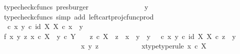 \begin{isabellebody}
\ {\isacharparenleft}{\kern0pt}typecheck{\isacharunderscore}{\kern0pt}cfuncs{\isacharcomma}{\kern0pt}\ presburger{\isacharparenright}{\kern0pt}\isanewline
\ \ \ \ \ \ \ \ \ \ \isamarkupfalse%
\ \isamarkupfalse%
\ {\isachardoublequoteopen}{\isachardot}{\kern0pt}{\isachardot}{\kern0pt}{\isachardot}{\kern0pt}\ {\isacharequal}{\kern0pt}\ y{\isachardoublequoteclose}\isanewline
\ \ \ \ \ \ \ \ \ \ \ \ \isamarkupfalse%
\ {\isacharparenleft}{\kern0pt}typecheck{\isacharunderscore}{\kern0pt}cfuncs{\isacharcomma}{\kern0pt}\ simp\ add{\isacharcolon}{\kern0pt}\ left{\isacharunderscore}{\kern0pt}cart{\isacharunderscore}{\kern0pt}proj{\isacharunderscore}{\kern0pt}cfunc{\isacharunderscore}{\kern0pt}prod{\isacharparenright}{\kern0pt}\isanewline
\ \ \ \ \ \ \ \ \ \ \isamarkupfalse%
\ \isamarkupfalse%
\ {\isachardoublequoteopen}{\isacharparenleft}{\kern0pt}{\isasymTheta}\ {\isasymcirc}\isactrlsub c\ {\isasymlangle}x{\isacharcomma}{\kern0pt}\ y{\isasymrangle}{\isacharparenright}{\kern0pt}\isactrlsup {\isasymflat}\ {\isasymcirc}\isactrlsub c\ {\isasymlangle}id\ X{\isacharcomma}{\kern0pt}\ {\isasymbeta}\isactrlbsub X\isactrlesub {\isasymrangle}\ {\isasymcirc}\isactrlsub c\ x\ {\isacharequal}{\kern0pt}\ y{\isachardoublequoteclose}\isacommand{{\isachardot}{\kern0pt}}\isamarkupfalse%
\isanewline
\ \ \ \ \ \ \ \ \isamarkupfalse%
\isanewline
\ \ \isanewline
\ \ \ \ \ \ \ \ \isamarkupfalse%
\ f{}{\isacharcolon}{\kern0pt}\ {\isachardoublequoteopen}{\isasymAnd}x\ y\ z{\isachardot}{\kern0pt}\ x\ {\isasymin}\isactrlsub c\ X\ {\isasymLongrightarrow}\ y\ {\isasymin}\isactrlsub c\ Y\ \ {\isasymLongrightarrow}\ \ z\ {\isasymin}\isactrlsub c\ X\ {\isasymLongrightarrow}\ z\ {\isasymnoteq}\ x\ {\isasymLongrightarrow}\ y\ {\isasymnoteq}\ y{}\ {\isasymLongrightarrow}\ {\isacharparenleft}{\kern0pt}{\isasymTheta}\ {\isasymcirc}\isactrlsub c\ {\isasymlangle}x{\isacharcomma}{\kern0pt}\ y{\isasymrangle}{\isacharparenright}{\kern0pt}\isactrlsup {\isasymflat}\ {\isasymcirc}\isactrlsub c\ {\isasymlangle}id\ X{\isacharcomma}{\kern0pt}\ {\isasymbeta}\isactrlbsub X\isactrlesub {\isasymrangle}\ {\isasymcirc}\isactrlsub c\ z\ {\isacharequal}{\kern0pt}\ y{}{\isachardoublequoteclose}\isanewline
\ \ \ \ \ \ \ \ \isamarkupfalse%
\ {\isacharminus}{\kern0pt}\ \isanewline
\ \ \ \ \ \ \ \ \ \ \isamarkupfalse%
\ x\ y\ z\isanewline
\ \ \ \ \ \ \ \ \ \ \isamarkupfalse%
\ x{\isacharunderscore}{\kern0pt}type{\isacharbrackleft}{\kern0pt}type{\isacharunderscore}{\kern0pt}rule{\isacharbrackright}{\kern0pt}{\isacharcolon}{\kern0pt}\ {\isachardoublequoteopen}x\ {\isasymin}\isactrlsub c\ X{\isachardoublequoteclose}\isanewline

\end{isabellebody}
